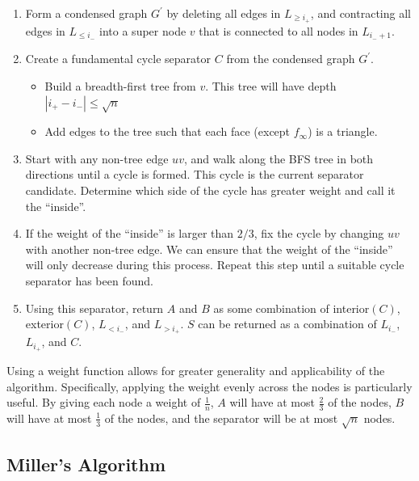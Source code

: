 \documentclass[11pt]{article}
\begin{document}
\begin{enumerate}
    \item Form a condensed graph $G^{'}$ by deleting  all edges in $L_{\geq i_+}$, and contracting all edges in $L_{\leq i_-}$ into a super node $v$ that is connected to all nodes in $L_{i_- + 1}$.

    \item Create a fundamental cycle separator $C$ from the condensed graph $G^{'}$.
    \begin{itemize}
        \item Build a breadth-first tree from $v$. This tree will have depth $|i_+ - i_-| \leq \sqrt{n}$

        \item Add edges to the tree such that each face (except $f_{\infty}$) is a triangle.
    \end{itemize}

    \item Start with any non-tree edge $uv$, and walk along the BFS tree in both directions until a cycle is formed. This cycle is the current separator candidate. Determine which side of the cycle has greater weight and call it the ``inside''.

    \item If the weight of the ``inside'' is larger than $2/3$, fix the cycle by changing $uv$ with another non-tree edge. We can ensure that the weight of the ``inside'' will only decrease during this process. Repeat this step until a suitable cycle separator has been found.

    \item Using this separator, return $A$ and $B$ as some combination of interior$(C)$, exterior$(C)$, $L_{< i_-}$, and $L_{> i_+}$. $S$ can be returned as a combination of $L_{i_-}$, $L_{i_+}$, and $C$.

\end{enumerate}

Using a weight function allows for greater generality and applicability of the algorithm. Specifically, applying the weight evenly across the nodes is particularly useful. By giving each node a weight of $\frac{1}{n}$, $A$ will have at most $\frac{2}{3}$ of the nodes, $B$ will have at most $\frac{1}{3}$ of the nodes, and the separator will be at most $\sqrt{n}$ nodes.

\subsection{Miller's Algorithm}
\label{sec:graph-sep-miller}
\end{document}
